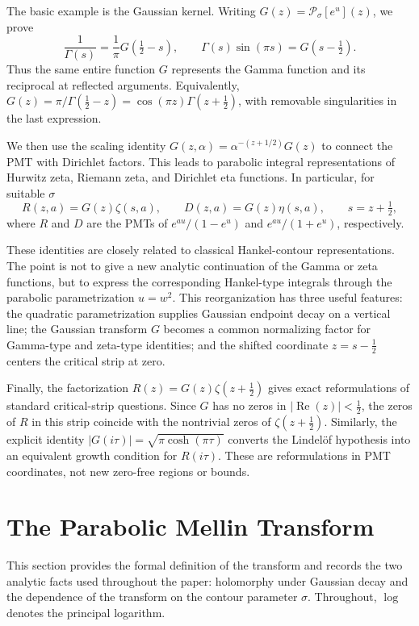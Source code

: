 \documentclass[12pt,english]{article}
\theoremstyle{plain} %
\theoremstyle{remark} %
\begin{document}
The basic example is the Gaussian kernel. Writing $G(z)=\mathcal{P}_{\sigma}[e^u](z)$, we prove
$$
\frac{1}{\Gamma(s)}
=
\frac{1}{\pi}G(\tfrac{1}{2}-s),
\qquad
\Gamma(s)\sin(\pi s)
=
G(s-\tfrac{1}{2}).
$$
Thus the same entire function $G$ represents the Gamma function and its reciprocal at reflected arguments. Equivalently, $G(z)=\pi/\Gamma(\tfrac{1}{2}-z)=\cos(\pi z)\Gamma(z+\tfrac{1}{2})$, with removable singularities in the last expression.

We then use the scaling identity $G(z,\alpha)=\alpha^{-(z+1/2)}G(z)$ to connect the PMT with Dirichlet factors. This leads to parabolic integral representations of Hurwitz zeta, Riemann zeta, and Dirichlet eta functions. In particular, for suitable $\sigma$
$$
R(z,a)=G(z)\zeta(s,a),
\qquad
D(z,a)=G(z)\eta(s,a),\qquad s=z+\tfrac{1}{2},
$$
where $R$ and $D$ are the PMTs of $e^{au}/(1-e^u)$ and $e^{au}/(1+e^u)$, respectively.

These identities are closely related to classical Hankel-contour representations. The point is not to give a new analytic continuation of the Gamma or zeta functions, but to express the corresponding Hankel-type integrals through the parabolic parametrization $u=w^2$. This reorganization has three useful features: the quadratic parametrization supplies Gaussian endpoint decay on a vertical line; the Gaussian transform $G$ becomes a common normalizing factor for Gamma-type and zeta-type identities; and the shifted coordinate $z=s-\tfrac{1}{2}$ centers the critical strip at zero.

Finally, the factorization $R(z)=G(z)\zeta(z+\tfrac{1}{2})$ gives exact reformulations of standard critical-strip questions. Since $G$ has no zeros in $|\operatorname{Re}(z)|<\tfrac{1}{2}$, the zeros of $R$ in this strip coincide with the nontrivial zeros of $\zeta(z+\tfrac{1}{2})$. Similarly, the explicit identity $|G(i\tau)|=\sqrt{\pi\cosh(\pi\tau)}$ converts the Lindel\"of hypothesis into an equivalent growth condition for $R(i\tau)$. These are reformulations in PMT coordinates, not new zero-free regions or bounds.


\section{The Parabolic Mellin Transform}
\label{sec:PMT}

This section provides the formal definition of the transform and records the two analytic facts used throughout the paper: holomorphy under Gaussian decay and the dependence of the transform on the contour parameter $\sigma$. Throughout, $\log$ denotes the principal logarithm.
\end{document}
